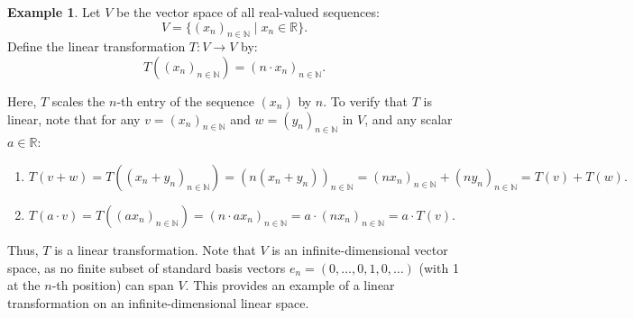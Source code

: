 \documentclass[12pt, reqno]{amsart}
\theoremstyle{definition}
\newtheorem{example}[theorem]{Example}
\numberwithin{equation}{section}
\newcommand{\dR}{{\mathbb R}}
\newcommand{\dN}{{\mathbb N}}
\begin{document}
\begin{comment}

    \begin{example}
    Let $T: \dR^2 \to \dR^2$ be a transformation defined by the matrix:

$$
T\left( \begin{pmatrix} x \\ y \end{pmatrix} \right) = \begin{pmatrix} 2x \\ 3y \end{pmatrix}
$$

In this case, for any vector $v = \begin{pmatrix} x \\ y \end{pmatrix}$ in $\dR^2$, the transformation $T$ scales the $x$-coordinate by 2 and the $y$-coordinate by 3. 

This transformation is linear because it satisfies:

(1) $T(v_1 + v_2) = T(v_1) + T(v_2)$

(2) $T(a \cdot v) = a \cdot T(v)$ for any scalar $a$.

    \end{example}
\end{comment}


\begin{example}
    Let \( V \) be the vector space of all real-valued sequences:
    $$
    V = \{ (x_n)_{n \in \dN} \mid x_n \in \dR \}.
    $$
    Define the linear transformation \( T: V \to V \) by:
    $$
    T\left( (x_n)_{n \in \dN} \right) = (n \cdot x_n)_{n \in \dN}.
    $$

    Here, \( T \) scales the \( n \)-th entry of the sequence \( (x_n) \) by \( n \). To verify that \( T \) is linear, note that for any \( v = (x_n)_{n \in \dN} \) and \( w = (y_n)_{n \in \dN} \) in \( V \), and any scalar \( a \in \dR \):
    \begin{enumerate}
        \item \( T(v + w) = T((x_n + y_n)_{n \in \dN}) = (n(x_n + y_n))_{n \in \dN} = (n x_n)_{n \in \dN} + (n y_n)_{n \in \dN} = T(v) + T(w). \)
        \item \( T(a \cdot v) = T((a x_n)_{n \in \dN}) = (n \cdot a x_n)_{n \in \dN} = a \cdot (n x_n)_{n \in \dN} = a \cdot T(v). \)
    \end{enumerate}

    Thus, \( T \) is a linear transformation. Note that \( V \) is an infinite-dimensional vector space, as no finite subset of standard basis vectors \( e_n = (0, \dots, 0, 1, 0, \dots) \) (with 1 at the \( n \)-th position) can span \( V \). This provides an example of a linear transformation on an infinite-dimensional linear space.
\end{example}
\end{document}
